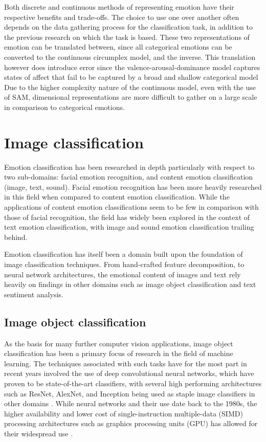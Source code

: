\documentclass{article}
\begin{document}
Both discrete and continuous methods of representing emotion have their respective benefits and trade-offs.
The choice to use one over another often depends on the data gathering process for the classification task, in addition to the previous research on which the task is based.
These two representations of emotion can be translated between, since all categorical emotions can be converted to the continuous circumplex model, and the inverse.
This translation however does introduce error since the valence-arousal-dominance model captures states of affect that fail to be captured by a broad and shallow categorical model 
Due to the higher complexity nature of the continuous model, even with the use of SAM, dimensional representations are more difficult to gather on a large scale in comparison to categorical emotions.


\section{Image classification}

Emotion classification has been researched in depth particularly with respect to two sub-domains: facial emotion recognition, and content emotion classification (image, text, sound).
Facial emotion recognition has been more heavily researched in this field when compared to content emotion classification.
While the applications of content emotion classifications seem to be few in comparison with those of facial recognition, the field has widely been explored in the context of text emotion classification, with image and sound emotion classification trailing behind.

Emotion classification has itself been a domain built upon the foundation of image classification techniques.
From hand-crafted feature decomposition, to neural network architectures, the emotional content of images and text rely heavily on findings in other domains such as image object classification and text sentiment analysis.

\subsection{Image object classification}

As the basis for many further computer vision applications, image object classification has been a primary focus of research in the field of machine learning.
The techniques associated with such tasks have for the most part in recent years involved the use of deep convolutional neural networks, which have proven to be state-of-the-art classifiers, with several high performing architectures such as ResNet, AlexNet, and Inception being used as staple image classifiers in other domains \citep{pan2009survey}.
While neural networks and their use date back to the 1980s, the higher availability and lower cost of single-instruction multiple-data (SIMD) processing architectures such as graphics processing units (GPU) has allowed for their widespread use \citep{rawat2017deep}.
\end{document}
